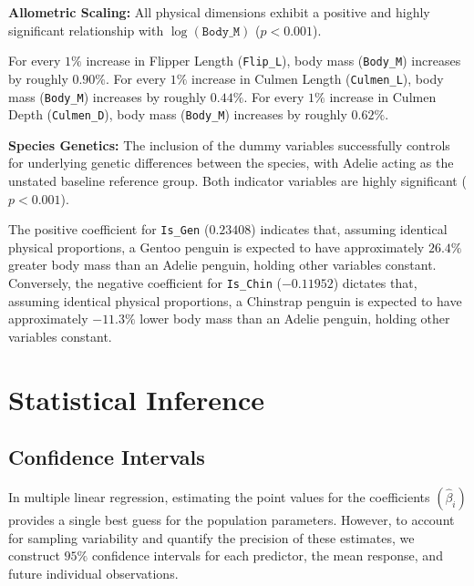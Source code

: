 \documentclass[12pt]{article}
\begin{document}
  \begin{itemize}
      \ii \textbf{Allometric Scaling:} All physical dimensions exhibit
      a positive and highly significant relationship with
      $\log(\texttt{Body\_M})$ ($p < 0.001$).
      \begin{itemize}
          \ii For every $1\%$ increase in Flipper Length (\texttt{Flip\_L}),
          body mass (\texttt{Body\_M}) increases by roughly $0.90\%$.
          \ii For every $1\%$ increase in Culmen Length (\texttt{Culmen\_L}),
          body mass (\texttt{Body\_M}) increases by roughly $0.44\%$.
          \ii For every $1\%$ increase in Culmen Depth (\texttt{Culmen\_D}),
          body mass (\texttt{Body\_M}) increases by roughly $0.62\%$.
      \end{itemize}
      \ii \textbf{Species Genetics:} The inclusion of the
      dummy variables successfully controls for
      underlying genetic differences between the species,
      with Adelie acting as the unstated baseline reference group.
      Both indicator variables are highly significant ($p < 0.001$).
      \begin{itemize}
          \ii The positive coefficient for \texttt{Is\_Gen} ($0.23408$)
          indicates that, assuming identical physical proportions,
          a Gentoo penguin is expected to have approximately
          $26.4\%$
          greater body mass than an Adelie penguin,
          holding other variables constant.
          \ii Conversely, the negative coefficient for
          \texttt{Is\_Chin} ($-0.11952$) dictates that,
          assuming identical physical proportions,
          a Chinstrap penguin is expected to have approximately
          $-11.3\%$
          lower body mass than an Adelie penguin,
          holding other variables constant.
      \end{itemize}
  \end{itemize}

  \section{Statistical Inference}

  \subsection{Confidence Intervals}

  In multiple linear regression,
  estimating the point values for the coefficients
  $(\hat{\beta}_i)$ provides a single best guess for the
  population parameters. However,
  to account for sampling variability and quantify the
  precision of these estimates, we construct $95\%$
  confidence intervals for each predictor, the mean response,
  and future individual observations.
\end{document}
